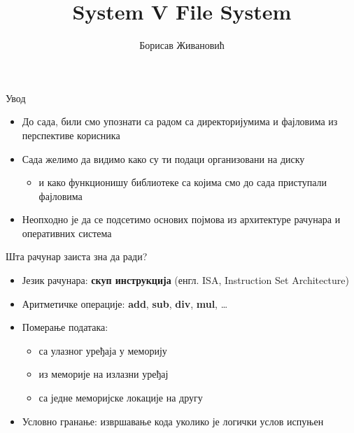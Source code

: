 \documentclass[xcolor=table]{beamer}
\title{System V File System}
\author{Борисав Живановић}
\begin{document}
    \begin{frame}
        \maketitle
    \end{frame}
    
    \begin{frame}{Увод}
        \begin{itemize}
            \item До сада, били смо упознати са радом са директоријумима и фајловима из перспективе корисника
            \item Сада желимо да видимо како су ти подаци организовани на диску
            \begin{itemize}
                \item и како функционишу библиотеке са којима смо до сада приступали фајловима
            \end{itemize}
            \item Неопходно је да се подсетимо основих појмова из архитектуре рачунара и оперативних система
        \end{itemize}
    \end{frame}
    
    \begin{frame}{Шта рачунар заиста зна да ради?}
        \begin{itemize}
            \item Језик рачунара: \textbf{скуп инструкција} (енгл. ISA, Instruction Set Architecture)
            \item Аритметичке операције: \textbf{add}, \textbf{sub}, \textbf{div}, \textbf{mul}, …
            \item Померање података:
            \begin{itemize}
                \item са улазног уређаја у меморију
                \item из меморије на излазни уређај
                \item са једне меморијске локације на другу
            \end{itemize}
            \item Условно гранање: извршавање кода уколико је логички услов испуњен
        \end{itemize}
    \end{frame}
    
\end{document}
